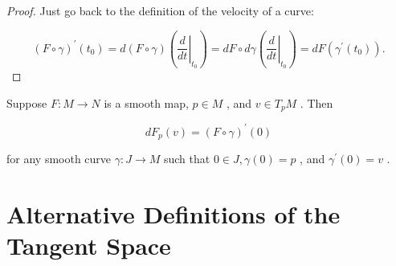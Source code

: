 \begin{proof}
\leanok
Just go back to the definition of the velocity of a curve:

\[
{\left( F \circ  \gamma \right) }^{\prime }\left( {t}_{0}\right)  = d\left( {F \circ  \gamma }\right) \left( {\left. \frac{d}{dt}\right| }_{{t}_{0}}\right)  = {dF} \circ  {d\gamma }\left( {\left. \frac{d}{dt}\right| }_{{t}_{0}}\right)  = {dF}\left( {{\gamma }^{\prime }\left( {t}_{0}\right) }\right) .
\]
\end{proof}

\begin{corollary}
\label{cor:3-25}
\leanok
{}
Suppose $F : M \rightarrow  N$ is a smooth map, $p \in  M$ , and $v \in  {T}_{p}M$ . Then

\[
d{F}_{p}\left( v\right)  = {\left( F \circ  \gamma \right) }^{\prime }\left( 0\right)
\]

for any smooth curve $\gamma  : J \rightarrow  M$ such that $0 \in  J,\gamma \left( 0\right)  = p$ , and ${\gamma }^{\prime }\left( 0\right)  = v$ .
\end{corollary}


\section{Alternative Definitions of the Tangent Space}

